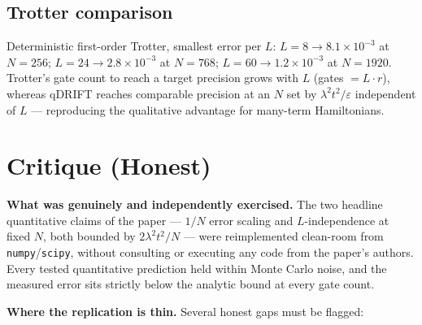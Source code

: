 \documentclass[11pt]{article}
\begin{document}
\subsection{Trotter comparison}
Deterministic first-order Trotter, smallest error per $L$:
$L = 8 \to 8.1\!\times\!10^{-3}$ at $N = 256$;
$L = 24 \to 2.8\!\times\!10^{-3}$ at $N = 768$;
$L = 60 \to 1.2\!\times\!10^{-3}$ at $N = 1920$.
Trotter's gate count to reach a target precision grows with $L$ (gates
$= L \cdot r$), whereas qDRIFT reaches comparable precision at an $N$ set by
$\lambda^{2} t^{2} / \varepsilon$ independent of $L$ --- reproducing the
qualitative advantage for many-term Hamiltonians.

\section{Critique (Honest)}

\textbf{What was genuinely and independently exercised.} The two headline
quantitative claims of the paper --- $1/N$ error scaling and $L$-independence
at fixed $N$, both bounded by $2 \lambda^{2} t^{2} / N$ --- were reimplemented
clean-room from \texttt{numpy}/\texttt{scipy}, without consulting or executing
any code from the paper's authors. Every tested quantitative prediction held
within Monte Carlo noise, and the measured error sits strictly below the
analytic bound at every gate count.

\textbf{Where the replication is thin.} Several honest gaps must be flagged:
\end{document}
